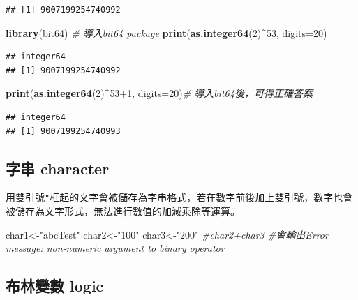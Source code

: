 \documentclass[]{book}
\newenvironment{Shaded}{\begin{snugshade}}{\end{snugshade}}
\newcommand{\KeywordTok}[1]{\textcolor[rgb]{0.13,0.29,0.53}{\textbf{{#1}}}}
\newcommand{\DataTypeTok}[1]{\textcolor[rgb]{0.13,0.29,0.53}{{#1}}}
\newcommand{\DecValTok}[1]{\textcolor[rgb]{0.00,0.00,0.81}{{#1}}}
\newcommand{\StringTok}[1]{\textcolor[rgb]{0.31,0.60,0.02}{{#1}}}
\newcommand{\CommentTok}[1]{\textcolor[rgb]{0.56,0.35,0.01}{\textit{{#1}}}}
\newcommand{\NormalTok}[1]{{#1}}
\theoremstyle{definition}
\theoremstyle{definition}
\theoremstyle{remark}
\begin{document}
\begin{verbatim}
## [1] 9007199254740992
\end{verbatim}

\begin{Shaded}
\begin{Highlighting}[]
\KeywordTok{library}\NormalTok{(bit64) }\CommentTok{# 導入bit64 package}
\KeywordTok{print}\NormalTok{(}\KeywordTok{as.integer64}\NormalTok{(}\DecValTok{2}\NormalTok{)^}\DecValTok{53}\NormalTok{, }\DataTypeTok{digits=}\DecValTok{20}\NormalTok{)}
\end{Highlighting}
\end{Shaded}

\begin{verbatim}
## integer64
## [1] 9007199254740992
\end{verbatim}

\begin{Shaded}
\begin{Highlighting}[]
\KeywordTok{print}\NormalTok{(}\KeywordTok{as.integer64}\NormalTok{(}\DecValTok{2}\NormalTok{)^}\DecValTok{53+1}\NormalTok{, }\DataTypeTok{digits=}\DecValTok{20}\NormalTok{)}\CommentTok{# 導入bit64後，可得正確答案}
\end{Highlighting}
\end{Shaded}

\begin{verbatim}
## integer64
## [1] 9007199254740993
\end{verbatim}

\subsection{字串 character}\label{-character}

用雙引號\texttt{"}框起的文字會被儲存為字串格式，若在數字前後加上雙引號，數字也會被儲存為文字形式，無法進行數值的加減乘除等運算。

\begin{Shaded}
\begin{Highlighting}[]
\NormalTok{char1<-}\StringTok{"abcTest"} 
\NormalTok{char2<-}\StringTok{"100"}
\NormalTok{char3<-}\StringTok{"200"}
\CommentTok{#char2+char3 #會輸出Error message: non-numeric argument to binary operator}
\end{Highlighting}
\end{Shaded}

\subsection{布林變數 logic}\label{-logic}
\end{document}
